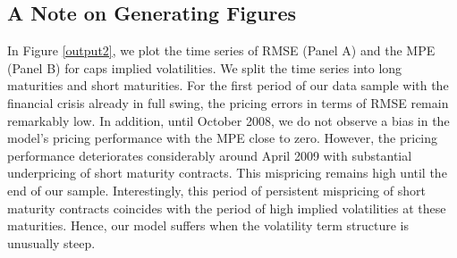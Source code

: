 \documentclass[11pt,a4paper,english,oneside]{book}
\numberwithin{equation}{chapter}
\begin{document}
\subsection{A Note on Generating Figures}



In Figure \ref{output2}, we plot the time series of RMSE  (Panel A) and the MPE (Panel B) for caps implied volatilities. We split the time series into long maturities and short maturities. For the first period of our data sample with the financial crisis already in full swing, the pricing errors in terms of RMSE remain remarkably low. In addition, until October 2008, we do not observe a bias in the model's pricing performance with the MPE close to zero. However, the pricing performance deteriorates considerably around April 2009 with substantial underpricing of short maturity contracts. This mispricing remains high until the end of our sample. Interestingly, this period of persistent mispricing of short maturity contracts coincides with the period of high implied volatilities at these maturities. Hence, our model suffers when the volatility term structure is unusually steep.
\end{document}
